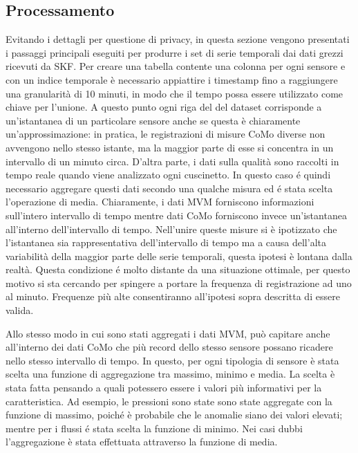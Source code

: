 \subsection{Processamento}
Evitando i dettagli per questione di privacy, in questa sezione vengono presentati i passaggi principali eseguiti per produrre i set di serie temporali dai dati grezzi ricevuti da SKF. 
Per creare una tabella contente una colonna per ogni sensore e con un indice temporale è necessario appiattire i timestamp fino a raggiungere una granularità di 10 minuti, in modo che il tempo possa essere utilizzato come chiave per l'unione. A questo punto ogni riga del del dataset corrisponde a un'istantanea di un particolare sensore anche se questa è chiaramente un'approssimazione: in pratica, le registrazioni di misure CoMo diverse non avvengono nello stesso istante, ma la maggior parte di esse si concentra in un intervallo di un minuto circa. 
D'altra parte, i dati sulla qualità sono raccolti in tempo reale quando viene analizzato ogni cuscinetto. In questo caso é quindi necessario aggregare questi dati secondo una qualche misura ed é stata scelta l'operazione di media.
Chiaramente, i dati MVM forniscono informazioni sull'intero intervallo di tempo mentre dati CoMo forniscono invece un'istantanea all'interno dell'intervallo di tempo.
Nell'unire queste misure si è ipotizzato che l'istantanea sia rappresentativa dell'intervallo di tempo ma a causa dell'alta variabilità della maggior parte delle serie temporali, questa ipotesi è lontana dalla realtà.
Questa condizione é molto distante da una situazione ottimale, per questo motivo si sta cercando per spingere a portare la frequenza di registrazione ad uno al minuto. Frequenze più alte consentiranno all'ipotesi sopra descritta di essere valida.

Allo stesso modo in cui sono stati aggregati i dati MVM, può capitare anche all'interno dei dati CoMo che più record dello stesso sensore possano ricadere nello stesso intervallo di tempo. In questo, per ogni tipologia di sensore è stata scelta una funzione di aggregazione tra massimo, minimo e media. La scelta è stata fatta pensando a quali potessero essere i valori più informativi per la caratteristica. Ad esempio, le pressioni sono state sono state aggregate con la funzione di massimo, poiché è probabile che le anomalie siano dei valori elevati; mentre per i flussi é stata scelta la funzione di minimo. Nei casi dubbi l'aggregazione è stata effettuata attraverso la funzione di media.

